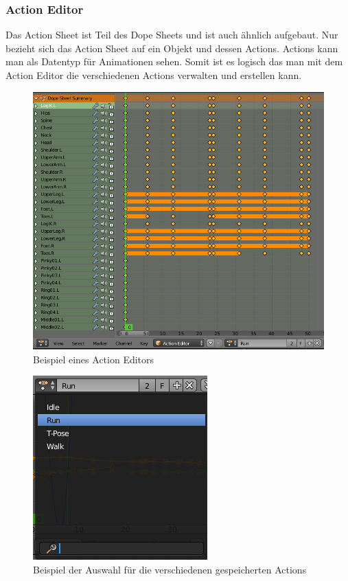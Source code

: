 \subsubsection{Action Editor}
Das Action Sheet ist Teil des Dope Sheets und ist auch ähnlich aufgebaut. Nur bezieht sich das Action Sheet auf ein Objekt und dessen Actions.
Actions kann man als Datentyp für Animationen sehen. Somit ist es logisch das man mit dem Action Editor die verschiedenen Actions verwalten und erstellen kann.

\begin{figure}[H]
                \centering

                \includegraphics[width=.8\textwidth]{images/animation_action_editor.PNG}
                \caption{Beispiel eines Action Editors}
\end{figure}

\begin{figure}[H]
    \centering

    \includegraphics[width=.8\textwidth]{images/animation_action_editor_actions.PNG}
    \caption{Beispiel der Auswahl für die verschiedenen gespeicherten Actions}
\end{figure}


